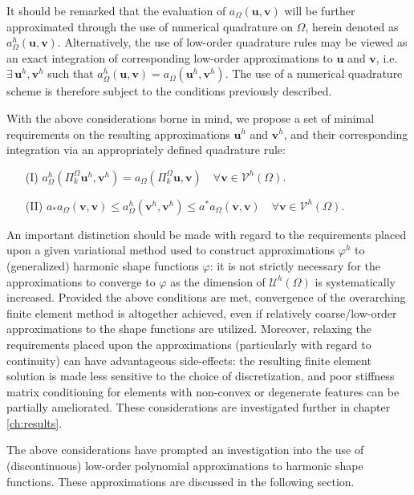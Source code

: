 	It should be remarked that the evaluation of $a_{\Omega}(\mathbf{u},\mathbf{v})$ will be further approximated through the use of numerical quadrature on $\Omega$, herein denoted as $a^h_{\Omega}(\mathbf{u},\mathbf{v})$. Alternatively, the use of low-order quadrature rules may be viewed as an exact integration of corresponding low-order approximations to $\mathbf{u}$ and $\mathbf{v}$, i.e. $\exists \, \mathbf{u}^h,\mathbf{v}^h$ such that $a^h_{\Omega}(\mathbf{u},\mathbf{v}) = a_{\Omega}(\mathbf{u}^h,\mathbf{v}^h)$. The use of a numerical quadrature scheme is therefore subject to the conditions previously described.
	
	With the above considerations borne in mind, we propose a set of minimal requirements on the resulting approximations $\mathbf{u}^h$ and $\mathbf{v}^h$, and their corresponding integration via an appropriately defined quadrature rule:
	\begin{itemize}
		\item[(I)] $a^h_{\Omega}(\Pi^{\Omega}_k \mathbf{u}^h,\mathbf{v}^h) = a_{\Omega}(\Pi^{\Omega}_k \mathbf{u},\mathbf{v}) \quad \forall \mathbf{v} \in \mathcal{V}^h (\Omega)$.
		\item[(II)] $a_* a_{\Omega} (\mathbf{v},\mathbf{v}) \leq a^h_{\Omega} (\mathbf{v}^h,\mathbf{v}^h) \leq a^* a_{\Omega} (\mathbf{v},\mathbf{v}) \quad \forall \mathbf{v} \in \mathcal{V}^h (\Omega).$
	\end{itemize}
	
	An important distinction should be made with regard to the requirements placed upon a given variational method used to construct approximations $\varphi^h$ to (generalized) harmonic shape functions $\varphi$: it is not strictly necessary for the approximations to converge to $\varphi$ as the dimension of $\mathcal{U}^h (\Omega)$ is systematically increased. Provided the above conditions are met, convergence of the overarching finite element method is altogether achieved, even if relatively coarse/low-order approximations to the shape functions are utilized. Moreover, relaxing the requirements placed upon the approximations (particularly with regard to continuity) can have advantageous side-effects: the resulting finite element solution is made less sensitive to the choice of discretization, and poor stiffness matrix conditioning for elements with non-convex or degenerate features can be partially ameliorated. These considerations are investigated further in chapter \ref{ch:results}.
	
	The above considerations have prompted an investigation into the use of (discontinuous) low-order polynomial approximations to harmonic shape functions. These approximations are discussed in the following section.
	
